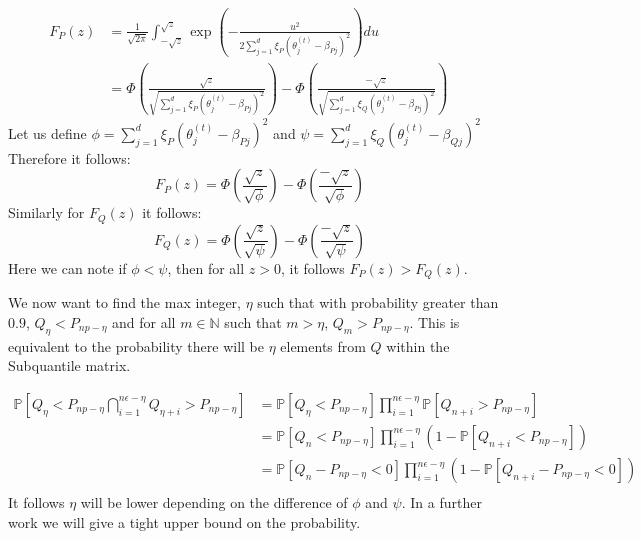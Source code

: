 \documentclass{article} %
\begin{document}
\begin{appendices}
	\begin{align}
		F_P(z) &= \frac{1}{\sqrt{2\pi}}\int_{-\sqrt{z}}^{\sqrt{z}}\exp\left(-\frac{u^2}{2\sum_{j=1}^d \xi_P\left(\theta_j^{(t)} - \beta_{Pj}\right)^2}\right)du &&\\
		&= \Phi\left(\frac{\sqrt{z}}{\sqrt{\sum_{j=1}^d \xi_P\left(\theta_j^{(t)}-\beta_{Pj}\right)^2}}\right) - \Phi\left(\frac{-\sqrt{z}}{\sqrt{\sum_{j=1}^d \xi_Q\left(\theta_j^{(t)}-\beta_{Pj}\right)^2}}\right) &&
	\end{align}
	Let us define $\displaystyle \phi = \sum_{j=1}^d \xi_P\left(\theta_j^{(t)} - \beta_{Pj}\right)^2$ and $\displaystyle \psi = \sum_{j=1}^d \xi_Q\left(\theta_j^{(t)} - \beta_{Qj}\right)^2$
	Therefore it follows:
	\begin{equation}
		F_P(z) = \Phi\left(\frac{\sqrt{z}}{\sqrt{\phi}}\right) - \Phi\left(\frac{-\sqrt{z}}{\sqrt{\phi}}\right)
	\end{equation}
	Similarly for $F_Q(z)$ it follows:
	\begin{equation}
		F_Q(z) = \Phi\left(\frac{\sqrt{z}}{\sqrt{\psi}}\right) - \Phi\left(\frac{-\sqrt{z}}{\sqrt{\psi}}\right)
	\end{equation}
	Here we can note if $\phi < \psi$, then for all $z > 0$, it follows $F_P(z) > F_Q(z)$.
	
	We now want to find the max integer, $\eta$ such that with probability greater than $0.9$, $Q_{\eta} < P_{np - \eta}$ and for all $m \in \mathbb{N}$ such that $m > \eta$, $Q_{m} > P_{np - \eta}$. This is equivalent to the probability there will be $\eta$ elements from $Q$ within the Subquantile matrix.

	\begin{align*}
		\mathbb{P}\left[Q_\eta < P_{np - \eta} \bigcap_{i=1}^{n\epsilon - \eta} Q_{\eta+ i} > P_{np - \eta}\right] &= \mathbb{P}\left[Q_\eta < P_{np - \eta}\right] \prod_{i=1}^{n\epsilon - \eta} \mathbb{P}\left[Q_{n+i} > P_{np - \eta}\right] &&\\
		&= \mathbb{P}\left[Q_n < P_{np - \eta}\right]\prod_{i=1}^{n\epsilon - \eta}\left(1 - \mathbb{P}\left[Q_{n+i} < P_{np - \eta}\right]\right) &&\\
		&= \mathbb{P}\left[Q_n - P_{np-\eta} < 0\right]\prod_{i=1}^{n\epsilon - \eta} \left(1 - \mathbb{P}\left[Q_{n+i} - P_{np-\eta} < 0\right]\right) &&\\
	\end{align*}
	It follows $\eta$ will be lower depending on the difference of $\phi$ and $\psi$. In a further work we will give a tight upper bound on the probability.


\end{appendices}
\end{document}
